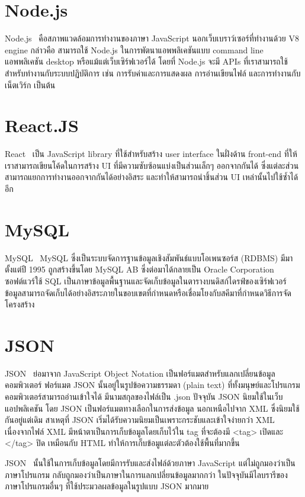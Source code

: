 \section{Node.js}
Node.js~\cite{NodeJS} คือสภาพแวดล้อมการทำงานของภาษา JavaScript นอกเว็บเบราว์เซอร์ที่ทำงานด้วย V8 engine กล่าวคือ สามารถใช้ Node.js ในการพัตนาแอพพลิเคชันแบบ command line แอพพลิเคชัน desktop หรือแม้แต่เว็บเซิร์ฟเวอร์ได้ 
โดยที่ Node.js จะมี APIs ที่เราสามารถใช้สำหรับทำงานกับระบบปฏิบัติการ เช่น การรับค่าและการแสดงผล การอ่านเขียนไฟล์ และการทำงานกับเน็ตเวิร์ก เป็นต้น

\section{React.JS}
React~\cite{ReactJS} เป็น JavaScript library ที่ใช้สำหรับสร้าง user interface ในฝั่งด้าน front-end ที่ให้เราสามารถเขียนโค้ดในการสร้าง UI ที่มีความซับซ้อนแบ่งเป็นส่วนเล็กๆ ออกจากกันได้ ซึ่งแต่ละส่วนสามารถแยกการทำงานออกจากกันได้อย่างอิสระ 
และทำให้สามารถนำชิ้นส่วน UI เหล่านั้นไปใช้ซ้ำได้อีก

\section{MySQL}
MySQL~\cite{MySQL} MySQL ซึ่งเป็นระบบจัดการฐานข้อมูลเชิงสัมพันธ์แบบโอเพนซอร์ส (RDBMS) มีมาตั้งแต่ปี 1995 ถูกสร้างขึ้นโดย MySQL AB ซึ่งต่อมาได้กลายเป็น Oracle Corporation ซอฟต์แวร์ใช้ SQL เป็นภาษาข้อมูลพื้นฐานและจัดเก็บข้อมูลในตารางบนดิสก์ไดรฟ์ของเซิร์ฟเวอร์ ข้อมูลสามารถจัดเก็บได้อย่างอิสระภายในขอบเขตที่กำหนดหรือเชื่อมโยงกับสคีมาที่กำหนดวิธีการจัดโครงสร้าง

\section{JSON}
JSON~\cite{1_JSON} ย่อมาจาก JavaScript Object Notation เป็นฟอร์แมตสำหรับแลกเปลี่ยนข้อมูลคอมพิวเตอร์
ฟอร์แมต JSON นั้นอยู่ในรูปข้อความธรรมดา (plain text) ที่ทั้งมนุษย์และโปรแกรมคอมพิวเตอร์สามารถอ่านเข้าใจได้ 
มีนามสกุลของไฟล์เป็น .json ปัจจุบัน JSON นิยมใช้ในเว็บแอปพลิเคชัน โดย JSON เป็นฟอร์แมตทางเลือกในการส่งข้อมูล นอกเหนือไปจาก XML ซึ่งนิยมใช้กันอยู่แต่เดิม 
สาเหตุที่ JSON เริ่มได้รับความนิยมเป็นเพราะกระชับและเข้าใจง่ายกว่า XML เนื่องจากไฟล์ XML มีหน้าตาเป็นการเก็บข้อมูลโดยเก็บไว้ใน tag
ที่จะต้องมี <tag> เปิดและ </tag> ปิด เหมือนกับ HTML ทำให้การเก็บข้อมูแต่ละตัวต้องใช้พื้นที่มากขึ้น

JSON~\cite{2_JSON} นั้นใช้ในการเก็บข้อมูลโดยมีการรับและส่งไฟล์ด้วยภาษา JavaScript แต่ไม่ถูกมองว่าเป็นภาษาโปรแกรม กลับถูกมองว่าเป็นภาษาในการแลกเปลี่ยนข้อมูลมากกว่า 
ในปัจจุบันมีไลบรารีของภาษาโปรแกรมอื่นๆ ที่ใช้ประมวลผลข้อมูลในรูปแบบ JSON มากมาย

